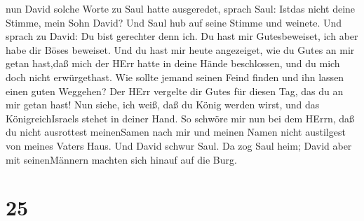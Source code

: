 nun David solche Worte zu Saul hatte ausgeredet, sprach Saul: Istdas
nicht deine Stimme, mein Sohn David? Und Saul hub auf seine Stimme und
weinete.  Und sprach zu David: Du bist gerechter denn ich.
Du hast mir Gutesbeweiset, ich aber habe dir Böses beweiset.
 Und du hast mir heute angezeiget, wie du Gutes an mir
getan hast,daß mich der HErr hatte in deine Hände beschlossen, und du
mich doch nicht erwürgethast.  Wie sollte jemand seinen
Feind finden und ihn lassen einen guten Weggehen? Der HErr vergelte dir
Gutes für diesen Tag, das du an mir getan hast!  Nun siehe,
ich weiß, daß du König werden wirst, und das KönigreichIsraels stehet in
deiner Hand.  So schwöre mir nun bei dem HErrn, daß du
nicht ausrottest meinenSamen nach mir und meinen Namen nicht austilgest
von meines Vaters Haus.  Und David schwur Saul. Da zog Saul
heim; David aber mit seinenMännern machten sich hinauf auf die Burg.

\hypertarget{section-24}{%
\section{25}\label{section-24}}

